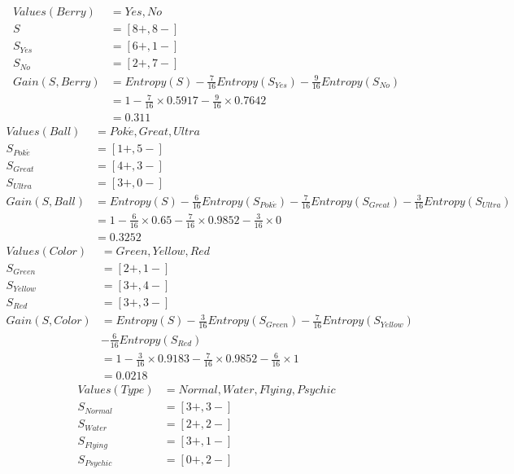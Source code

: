 \begin{enumerate}
\begin{enumerate}
\begin{align*} 
Values(Berry) &= Yes , No\\
S &= \left [ 8+, 8- \right ] \\
S_{Yes} &= \left [ 6+, 1- \right ] \\
S_{No} &= \left [ 2+, 7- \right ] \\
Gain(S , Berry) &= Entropy(S) - \frac{7}{16} Entropy(S_{Yes}) - \frac{9}{16} Entropy(S_{No})\\
&= 1 - \frac{7}{16} \times 0.5917 - \frac{9}{16} \times 0.7642\\
&= 0.311
\end{align*}
\begin{align*} 
Values(Ball) &= Pok \acute e , Great , Ultra\\
S_{Pok \acute e} &= \left [ 1+, 5- \right ] \\
S_{Great} &= \left [ 4+, 3- \right ] \\
S_{Ultra} &= \left [ 3+, 0- \right ] \\
Gain(S , Ball) &= Entropy(S) - \frac{6}{16} Entropy(S_{Pok \acute e}) - \frac{7}{16} Entropy(S_{Great}) - \frac{3}{16} Entropy(S_{Ultra})\\
&= 1 - \frac{6}{16} \times 0.65 - \frac{7}{16} \times 0.9852 -\frac{3}{16} \times 0\\
&= 0.3252
\end{align*}
\begin{align*} 
Values(Color) &= Green , Yellow , Red\\
S_{Green} &= \left [ 2+, 1- \right ] \\
S_{Yellow} &= \left [ 3+, 4- \right ] \\
S_{Red} &= \left [ 3+, 3- \right ] \\
Gain(S , Color) &= Entropy(S) - \frac{3}{16} Entropy(S_{Green}) - \frac{7}{16} Entropy(S_{Yellow}) \\ 
&- \frac{6}{16} Entropy(S_{Red})\\
&= 1 - \frac{3}{16} \times 0.9183 - \frac{7}{16} \times 0.9852 -\frac{6}{16} \times 1\\
&= 0.0218
\end{align*}
\begin{align*} 
Values(Type) &= Normal , Water , Flying, Psychic\\
S_{Normal} &= \left [ 3+, 3- \right ] \\
S_{Water} &= \left [ 2+, 2- \right ] \\
S_{Flying} &= \left [ 3+, 1- \right ] \\
S_{Psychic} &= \left [ 0+, 2- \right ] \\

\end{align*}
\end{enumerate}
\end{enumerate}
